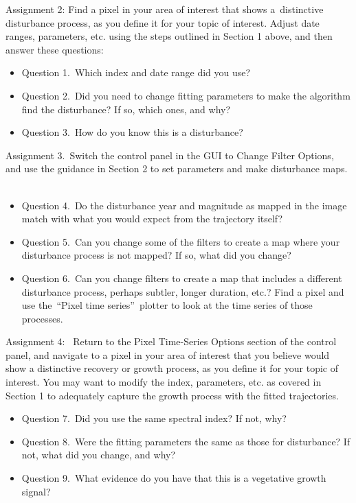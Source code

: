 \documentclass[
  letterpaper,
  DIV=11,
  numbers=noendperiod]{scrreprt}
\providecommand{\tightlist}{%
  \setlength{\itemsep}{0pt}\setlength{\parskip}{0pt}}\usepackage{longtable,booktabs,array}
\begin{document}
Assignment 2: Find a pixel in your area of interest that shows
a~distinctive disturbance process, as you define it for your topic of
interest. Adjust date ranges, parameters, etc. using the steps outlined
in Section 1 above, and then answer these questions:

\begin{itemize}
\tightlist
\item
  Question 1.~Which index and date range did you use?
\item
  Question 2.~Did you need to change fitting parameters to make the
  algorithm find the disturbance? If so, which ones, and why?
\item
  Question 3.~How do you know this is a disturbance?
\end{itemize}

Assignment 3.~Switch the control panel in the GUI to Change Filter
Options, and use the guidance in Section 2 to set parameters and make
disturbance maps. ~

\begin{itemize}
\tightlist
\item
  Question 4.~Do the disturbance year and magnitude as mapped in the
  image match with what you would expect from the trajectory itself?
\item
  Question 5.~Can you change some of the filters to create a map where
  your disturbance process is not mapped? If so, what did you change? ~
\item
  Question 6.~Can you change filters to create a map that includes a
  different disturbance process, perhaps subtler, longer duration, etc.?
  Find a pixel and use the~``Pixel time series''~plotter to look at the
  time series of those processes.
\end{itemize}

Assignment 4:~ Return to the Pixel Time-Series Options section of the
control panel, and navigate to a pixel in your area of interest that you
believe would show a distinctive recovery or growth process, as you
define it for your topic of interest. You may want to modify the index,
parameters, etc. as covered in Section 1 to adequately capture the
growth process with the fitted trajectories.

\begin{itemize}
\tightlist
\item
  Question 7.~Did you use the same spectral index? If not, why?
\item
  Question 8.~Were the fitting parameters the same as those for
  disturbance? If not, what did you change, and why?
\item
  Question 9.~What evidence do you have that this is a vegetative growth
  signal?
\end{itemize}
\end{document}
